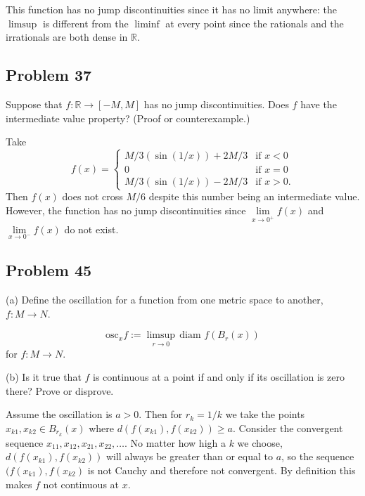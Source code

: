 \documentclass{amsart}
\begin{document}
\medskip\noindent This function has no jump discontinuities since
it has no limit anywhere: the $\limsup$ is different from the $\liminf$ at every point since the rationals
and the irrationals are both dense in $\mathbb{R}$. 

\medskip \noindent

\newpage

\subsection*{Problem 37} Suppose that $f: \mathbb{R}\rightarrow[-M, M]$ has no jump discontinuities.
Does $f$ have the intermediate value property? (Proof or counterexample.)

\medskip \noindent Take \[f(x) =\begin{cases}
	M/3(\sin(1/x))+2M/3 & \text{if } x<0\\
	0 & \text{if }x=0 \\
	M/3(\sin(1/x))-2M/3 & \text{if } x>0.
\end{cases} \]
Then $f(x)$ does not cross $M/6$ despite this number being an intermediate value. However,
the function has no jump discontinuities since $\lim\limits_{x\rightarrow 0^+}f(x)$ and $\lim\limits_{x\rightarrow 0^-}f(x)$
do not exist.

\newpage

\subsection*{Problem 45}

(a) Define the oscillation for a function from one metric space to
another, $f: M\rightarrow N$. 

\medskip \noindent \[\text{osc}_xf:=\limsup_{r\rightarrow 0} \,\text{diam }f(B_r(x))\] for $f: M\rightarrow N$.

(b) Is it true that $f$ is continuous at a point if and only if its oscillation is zero there? 
Prove or disprove.

\medskip \noindent Assume the oscillation is $a>0$. Then for $r_k= 1/k$ we take the points $x_{k1}
, x_{k2}\in B_{r_k}(x)$ where $d(f(x_{k1}), f(x_{k2}))\geq a$. Consider the convergent sequence 
$x_{11}, x_{12}, x_{21}, x_{22},\dots$. No matter how high a $k$ we choose, $d(f(x_{k1}),f(x_{k2}))$
will always be greater than or equal to $a$, so the sequence $(f(x_{k1}), f(x_{k2})$ is not Cauchy 
and therefore not convergent. By definition this makes $f$ not continuous at $x$. 

\bigskip
\end{document}
